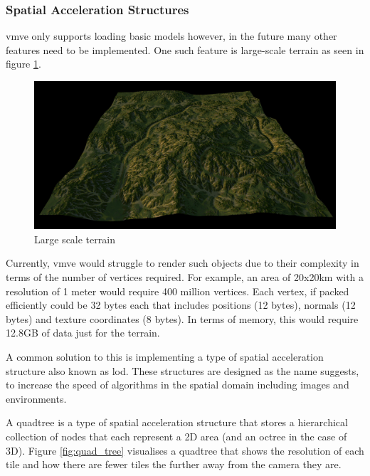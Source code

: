 \documentclass[11pt]{article}
\begin{document}
\subsubsection{Spatial Acceleration Structures}
\gls*{vmve} only supports loading basic models however, in the future many other
features need to be implemented. One such feature is large-scale terrain as seen
in figure \ref{fig:quad_tree_terrain}.

\begin{figure}[H]
  \centering
  \includegraphics[width=\textwidth]{images/quad_tree_terrain.png}
  \caption{Large scale terrain}
  \label{fig:quad_tree_terrain}
\end{figure}

Currently, \gls*{vmve} would struggle to render such objects due to their
complexity in terms of the number of vertices required. For example, an area of
20x20km with a resolution of 1 meter would require 400 million vertices. Each
vertex, if packed efficiently could be 32 bytes each that includes positions (12
bytes), normals (12 bytes) and texture coordinates (8 bytes). In terms of
memory, this would require 12.8GB of data just for the terrain.

A common solution to this is implementing a type of spatial acceleration
structure also known as \gls*{lod}. These structures are designed as the name
suggests, to increase the speed of algorithms in the spatial domain including
images and environments.

A quadtree is a type of spatial acceleration structure that stores a
hierarchical collection of nodes that each represent a 2D area (and an octree in
the case of 3D). Figure \ref{fig:quad_tree} visualises a quadtree that shows
the resolution of each tile and how there are fewer tiles the further away from
the camera they are.
\end{document}
